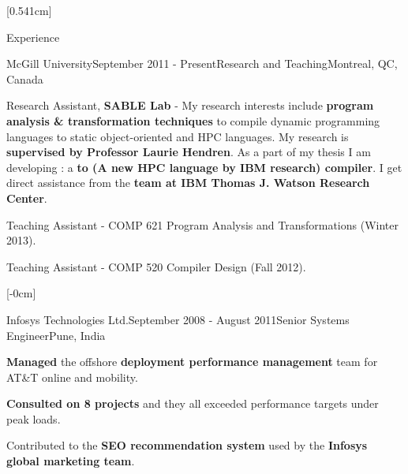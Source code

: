 \documentclass{resume} %
\begin{document}
[0.541cm]%
\begin{rSection}{Experience}
\begin{rSubsection}{McGill University}{September 2011 - Present}{Research and Teaching}{Montreal, QC, Canada}
\item Research Assistant, \textbf{SABLE Lab} - My research interests include \textbf{program analysis \& transformation techniques} to compile dynamic 
programming languages to static object-oriented and HPC languages. My research is \textbf{supervised by Professor Laurie Hendren}. As a part of my thesis 
I am developing \mixten: a \textbf{\matlab to \xten (A new HPC language by IBM research) compiler}. I get direct assistance 
from the \textbf{\xten team at IBM Thomas J. Watson Research Center}.   
\item Teaching Assistant - COMP 621 Program Analysis and Transformations (Winter 2013). 
\item Teaching Assistant - COMP 520 Compiler Design (Fall 2012).
\end{rSubsection}

[-0cm]
\begin{rSubsection}{Infosys Technologies Ltd.}{September 2008 - August 2011}{Senior Systems Engineer}{Pune, India}
\item \textbf{Managed} the offshore \textbf{deployment performance management} team for AT\&T online and mobility.
\item \textbf{Consulted on 8 projects} and they all exceeded performance targets under peak loads.
\item Contributed to the \textbf{SEO recommendation system} used by the \textbf{Infosys global marketing team}.
\end{rSubsection}


\end{rSection}
\end{document}
